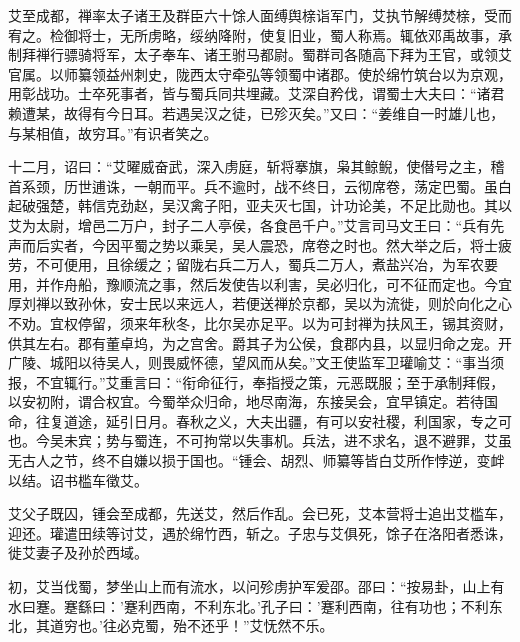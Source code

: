 \documentclass[12pt,UTF8]{ctexbook}
\begin{document}
艾至成都，禅率太子诸王及群臣六十馀人面缚舆榇诣军门，艾执节解缚焚榇，受而宥之。检御将士，无所虏略，绥纳降附，使复旧业，蜀人称焉。辄依邓禹故事，承制拜禅行骠骑将军，太子奉车、诸王驸马都尉。蜀群司各随高下拜为王官，或领艾官属。以师纂领益州刺史，陇西太守牵弘等领蜀中诸郡。使於绵竹筑台以为京观，用彰战功。士卒死事者，皆与蜀兵同共埋藏。艾深自矜伐，谓蜀士大夫曰：“诸君赖遭某，故得有今日耳。若遇吴汉之徒，已殄灭矣。”又曰：“姜维自一时雄儿也，与某相值，故穷耳。”有识者笑之。

十二月，诏曰：“艾曜威奋武，深入虏庭，斩将搴旗，枭其鲸鲵，使僣号之主，稽首系颈，历世逋诛，一朝而平。兵不逾时，战不终日，云彻席卷，荡定巴蜀。虽白起破强楚，韩信克劲赵，吴汉禽子阳，亚夫灭七国，计功论美，不足比勋也。其以艾为太尉，增邑二万户，封子二人亭侯，各食邑千户。”艾言司马文王曰：“兵有先声而后实者，今因平蜀之势以乘吴，吴人震恐，席卷之时也。然大举之后，将士疲劳，不可便用，且徐缓之；留陇右兵二万人，蜀兵二万人，煮盐兴冶，为军农要用，并作舟船，豫顺流之事，然后发使告以利害，吴必归化，可不征而定也。今宜厚刘禅以致孙休，安士民以来远人，若便送禅於京都，吴以为流徙，则於向化之心不劝。宜权停留，须来年秋冬，比尔吴亦足平。以为可封禅为扶风王，锡其资财，供其左右。郡有董卓坞，为之宫舍。爵其子为公侯，食郡内县，以显归命之宠。开广陵、城阳以待吴人，则畏威怀德，望风而从矣。”文王使监军卫瓘喻艾：“事当须报，不宜辄行。”艾重言曰：“衔命征行，奉指授之策，元恶既服；至于承制拜假，以安初附，谓合权宜。今蜀举众归命，地尽南海，东接吴会，宜早镇定。若待国命，往复道途，延引日月。春秋之义，大夫出疆，有可以安社稷，利国家，专之可也。今吴未宾；势与蜀连，不可拘常以失事机。兵法，进不求名，退不避罪，艾虽无古人之节，终不自嫌以损于国也。“锺会、胡烈、师纂等皆白艾所作悖逆，变衅以结。诏书槛车徵艾。

艾父子既囚，锺会至成都，先送艾，然后作乱。会已死，艾本营将士追出艾槛车，迎还。瓘遣田续等讨艾，遇於绵竹西，斩之。子忠与艾俱死，馀子在洛阳者悉诛，徙艾妻子及孙於西域。

初，艾当伐蜀，梦坐山上而有流水，以问殄虏护军爰邵。邵曰：“按易卦，山上有水曰蹇。蹇繇曰：'蹇利西南，不利东北。'孔子曰：'蹇利西南，往有功也；不利东北，其道穷也。'往必克蜀，殆不还乎！”艾怃然不乐。
\end{document}
